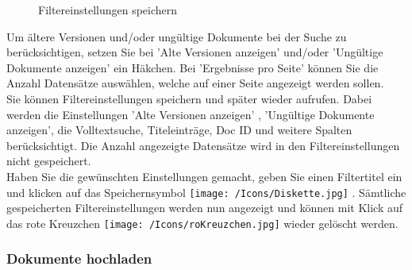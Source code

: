 \begin{figure}[H]
\caption{Filtereinstellungen speichern}
\end{figure}

Um ältere Versionen und/oder ungültige Dokumente bei der Suche zu berücksichtigen, setzen Sie bei 'Alte Versionen anzeigen'  und/oder 'Ungültige Dokumente anzeigen'  ein Häkchen. Bei 'Ergebnisse pro Seite'  können Sie die Anzahl Datensätze auswählen, welche auf einer Seite angezeigt werden sollen.\\
Sie können Filtereinstellungen speichern und später wieder aufrufen. Dabei werden die Einstellungen 'Alte Versionen anzeigen' , 'Ungültige Dokumente anzeigen', die Volltextsuche, Titeleinträge, Doc ID und weitere Spalten berücksichtigt. Die Anzahl angezeigte Datensätze wird in den Filtereinstellungen nicht gespeichert.\\
Haben Sie die gewünschten Einstellungen gemacht, geben Sie einen Filtertitel ein  und klicken auf das Speichernsymbol \texttt{[image: /Icons/Diskette.jpg]} . Sämtliche gespeicherten Filtereinstellungen werden nun angezeigt  und können mit Klick auf das rote Kreuzchen \texttt{[image: /Icons/roKreuzchen.jpg]}  wieder gelöscht werden.


\subsubsection{Dokumente hochladen}
\label{bkm:Ref442863508}\label{bkm:Ref442787515}\label{bkm:Ref442778397}\label{bkm:Ref442770648}\label{bkm:Ref442769978}

\begin{figure}[H]
\end{figure}

